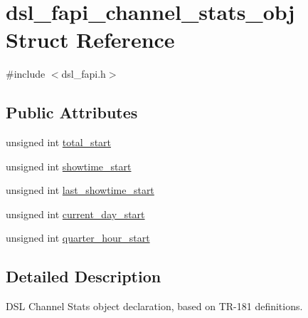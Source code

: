 \hypertarget{structdsl__fapi__channel__stats__obj}{\section{dsl\-\_\-fapi\-\_\-channel\-\_\-stats\-\_\-obj Struct Reference}
\label{structdsl__fapi__channel__stats__obj}
}


{\ttfamily \#include $<$dsl\-\_\-fapi.\-h$>$}

\subsection*{Public Attributes}
\begin{DoxyCompactItemize}
\item 
unsigned int \hyperlink{structdsl__fapi__channel__stats__obj_a40d5d021d50f908b763acf052b70d532}{total\-\_\-start}
\item 
unsigned int \hyperlink{structdsl__fapi__channel__stats__obj_ab49f9ff4bdff8cb3538236a8ce128f4b}{showtime\-\_\-start}
\item 
unsigned int \hyperlink{structdsl__fapi__channel__stats__obj_a7ebc0d2400a363971384bca8c17ac803}{last\-\_\-showtime\-\_\-start}
\item 
unsigned int \hyperlink{structdsl__fapi__channel__stats__obj_a92ac5b795668274a880a3f2e71cf3f99}{current\-\_\-day\-\_\-start}
\item 
unsigned int \hyperlink{structdsl__fapi__channel__stats__obj_aaa1e938c3a0d66c370fd3c49b178f907}{quarter\-\_\-hour\-\_\-start}
\end{DoxyCompactItemize}


\subsection{Detailed Description}
D\-S\-L Channel Stats object declaration, based on T\-R-\/181 definitions. 


